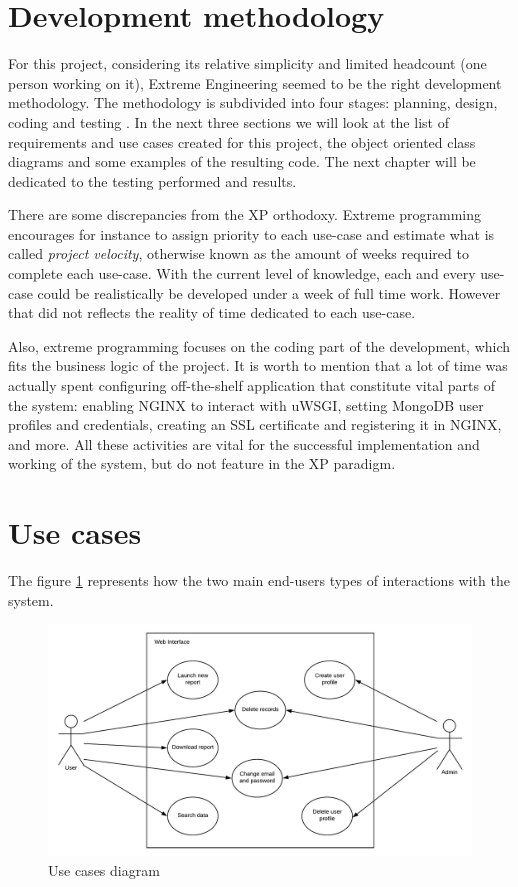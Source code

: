 \section{Development methodology}
For this project, considering its relative simplicity and limited headcount
(one person working on it), Extreme Engineering seemed to be the right
development methodology. The methodology is subdivided into four stages:
planning, design, coding and testing \cite{RP05}. In the next three sections we
will look at the list of requirements and use cases created for this
project, the object oriented class diagrams and some examples of the resulting
code. The next chapter will be dedicated to the testing performed and results.

There are some discrepancies from the XP orthodoxy. Extreme programming
encourages for instance to assign priority to each use-case and estimate what is
called \emph{project velocity}, otherwise known as the amount of weeks required
to complete each use-case. With the current level of knowledge, each and every
use-case could be realistically be developed under a week of full time work.
However that did not reflects the reality of time dedicated to each use-case.

Also, extreme programming focuses on the coding part of the development, which
fits the business logic of the project. It is worth to mention that a lot of
time was actually spent configuring off-the-shelf application that constitute
vital parts of the system: enabling NGINX to interact with uWSGI, setting
MongoDB user profiles and credentials, creating an SSL certificate and
registering it in NGINX, and more. All these activities are vital for the
successful implementation and working of the system, but do not feature in the
XP paradigm.


\section{Use cases}
The figure \ref{fig:usecases} represents how the two main end-users types of 
interactions with the system.

\begin{figure}[h!]
\centering
\includegraphics[scale=0.6]{imgs/UseCasesDiag.pdf}
\caption{Use cases diagram}
\label{fig:usecases}
\end{figure}

